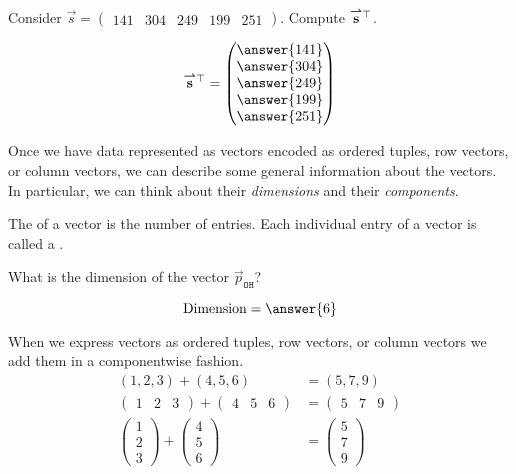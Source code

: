 \documentclass{ximera}
\begin{document}
\begin{question}
  Consider $\vec{s} = \begin{pmatrix}141 & 304 & 249 & 199 & 251 \end{pmatrix}$. Compute ${\overset{\boldsymbol{\rightharpoonup}}{\mathbf{s}}}\hspace{0in}^\top$.
  \begin{prompt}
  \[
  \vec{s}^\transpose  = \begin{pmatrix}\answer{141} \\ \answer{304} \\ \answer{249} \\ \answer{199} \\ \answer{251} \end{pmatrix}
  \]
  \end{prompt}
\end{question}

Once we have data represented as vectors encoded as ordered tuples,
row vectors, or column vectors, we can describe some general
information about the vectors. In particular, we can think about their
\textit{dimensions} and their \textit{components}.
%
%
%


\begin{definition}
The  of a vector is the number of entries. Each
individual entry of a vector is called a .
\end{definition}

\begin{question}
  What is the dimension of the vector $\vec{p}_{\texttt{OH}}$?
  \begin{prompt}
  \[
  \text{Dimension} = \answer{6}
  \]
  \end{prompt}
\end{question}


When we express vectors as ordered tuples, row vectors, or column
vectors we add them in a componentwise fashion.
\begin{align*}
  (1,2,3) + (4,5,6) &= (5,7,9)\\
  \begin{pmatrix} 1 & 2 & 3   \end{pmatrix} + \begin{pmatrix} 4 & 5 & 6   \end{pmatrix} &= \begin{pmatrix} 5 & 7 & 9   \end{pmatrix}\\
  \begin{pmatrix} 1\\ 2\\ 3   \end{pmatrix} + \begin{pmatrix} 4\\ 5\\ 6   \end{pmatrix} &= \begin{pmatrix} 5\\ 7\\ 9   \end{pmatrix}
\end{align*}
\end{document}
